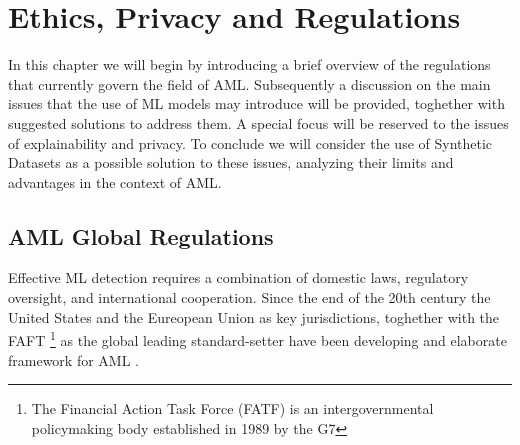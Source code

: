 \chapter{Ethics, Privacy and Regulations}
\label{ethics_privacy_regulations}
In this chapter we will begin by introducing a brief overview of the regulations that currently govern the field of AML.
Subsequently a discussion on the main issues that the use of ML models may introduce will be provided, toghether with suggested solutions to address them. A special focus will be reserved to the issues of explainability and privacy.
To conclude we will consider the use of Synthetic Datasets as a possible solution to these issues, analyzing their limits and advantages in the context of AML.
\section{AML Global Regulations}
Effective ML detection requires a combination of domestic laws, regulatory oversight, and international cooperation. Since the end of the 20th century the United States and the Eureopean Union as key jurisdictions, toghether with the FAFT \footnote{The Financial Action Task Force (FATF) is an intergovernmental policymaking body established in 1989 by the G7} as the global leading standard-setter have been developing and elaborate framework for AML \cite{regulations}.

